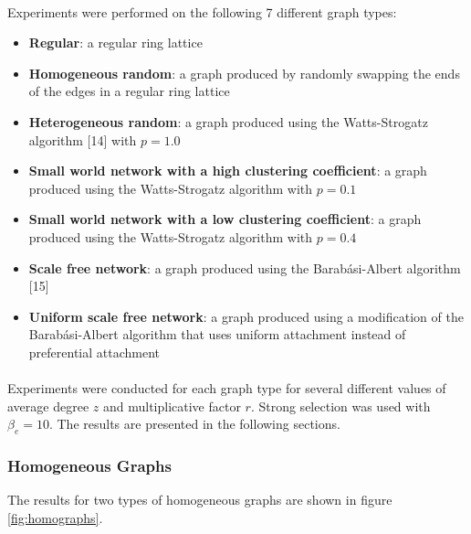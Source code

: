 \documentclass{article}
\begin{document}
	\paragraph{}Experiments were performed on the following 7 different graph types:
	\begin{itemize}
		\item \textbf{Regular}: a regular ring lattice
		\item \textbf{Homogeneous random}: a graph produced by randomly swapping the ends of the edges in a regular ring lattice
		\item \textbf{Heterogeneous random}: a graph produced using the Watts-Strogatz algorithm [14] with $p = 1.0$
		\item \textbf{Small world network with a high clustering coefficient}: a graph produced using the Watts-Strogatz algorithm with $p = 0.1$
		\item \textbf{Small world network with a low clustering coefficient}: a graph produced using the Watts-Strogatz algorithm with $p = 0.4$
		\item \textbf{Scale free network}: a graph produced using the Barab\'{a}si-Albert algorithm [15]
		\item \textbf{Uniform scale free network}: a graph produced using a modification of the Barab\'{a}si-Albert algorithm that uses uniform attachment instead of preferential attachment
	\end{itemize}

	\paragraph{}Experiments were conducted for each graph type for several different values of average degree $z$ and multiplicative factor $r$.  Strong selection was used with $\beta_e=10$.  The results are presented in the following sections.

	\subsubsection{Homogeneous Graphs}
	The results for two types of homogeneous graphs are shown in figure \ref{fig:homographs}.
\end{document}
